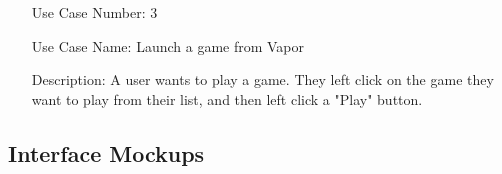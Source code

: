 \documentclass[10pt,conference,onecolumn,compsoc]{IEEEtran}
\begin{document}
\begin{itemize}
\item[Use Case Number:] 3
\item[Use Case Name:] Launch a game from Vapor
\item[Description:] A user wants to play a game. They left click on the game they want to play from their list, and then left click a "Play" button.
\end{itemize}

%
%
%
\subsection{Interface Mockups}
%
%
%
%
%
%
\end{document}
